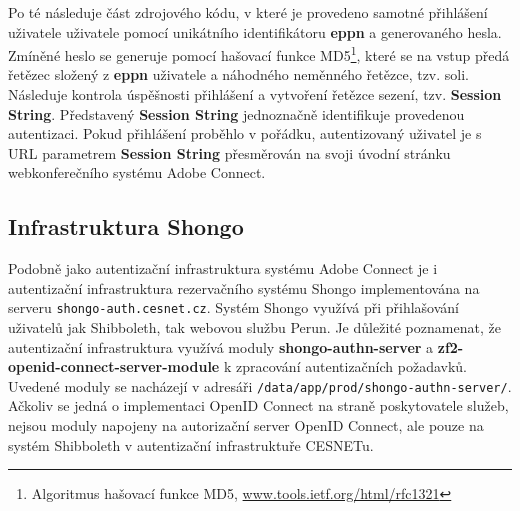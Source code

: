 \documentclass[
  printed, %
  twoside, %
  table,   %
  nolof,     %
  nolot,     %
]{fithesis3}
\begin{document}
Po té následuje část zdrojového kódu, v které je provedeno samotné přihlášení uživatele uživatele pomocí unikátního identifikátoru \textbf{eppn} a generovaného hesla. Zmíněné heslo se generuje pomocí hašovací funkce MD5\footnote{Algoritmus hašovací funkce MD5, \url{www.tools.ietf.org/html/rfc1321}}, které se na vstup předá řetězec složený z \textbf{eppn} uživatele a náhodného neměnného řetězce, tzv. soli. Následuje kontrola úspěšnosti přihlášení a vytvoření řetězce sezení, tzv. \textbf{Session String}. Představený \textbf{Session String} jednoznačně identifikuje provedenou autentizaci. Pokud přihlášení proběhlo v pořádku, autentizovaný uživatel je s URL parametrem \textbf{Session String} přesměrován na svoji úvodní stránku webkonferečního systému Adobe Connect.      

\subsection{Infrastruktura Shongo}
Podobně jako autentizační infrastruktura systému Adobe Connect je i autentizační infrastruktura rezervačního systému Shongo implementována na serveru \texttt{shongo-auth.cesnet.cz}. Systém Shongo využívá při přihlašování uživatelů jak Shibboleth, tak webovou službu Perun. Je důležité poznamenat, že autentizační infrastruktura využívá moduly \textbf{shongo-authn-server} a \textbf{zf2-openid-connect-server-module} k zpracování autentizačních požadavků. Uvedené moduly se nacházejí v adresáři \texttt{/data/app/prod/shongo-authn-server/}. Ačkoliv se jedná o implementaci OpenID Connect na straně poskytovatele služeb, nejsou moduly napojeny na autorizační server OpenID Connect, ale pouze na systém Shibboleth v autentizační infrastruktuře CESNETu. \par
\end{document}
